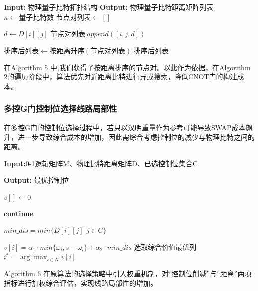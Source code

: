 \documentclass[10.5pt,compsoc,UTF8]{CjC}
\theoremstyle{mystyle}
\begin{document}
\begin{algorithm}[H]
\caption{按距离排序节点对}
\begin{algorithmic}[1]
\State \textbf{Input:} 物理量子比特拓扑结构
\State \textbf{Output:} 物理量子比特距离矩阵列表
\State $n \gets \text{量子比特数}$
\State $\text{节点对列表} \gets []$ 

        \State $d \gets D[i][j]$
        \State $\text{节点对列表}.append([i, j, d])$
    \EndFor
\EndFor

\State $\text{排序后列表} \gets \text{按距离升序}(\text{节点对列表})$
\State \Return 排序后列表

\end{algorithmic}
\end{algorithm}


在Algorithm 5 中,我们获得了按距离排序的节点对。以此作为依据，在Algorithm 2的遍历阶段中，算法优先对近距离比特进行异或搜索，降低CNOT门的构建成本。

\subsubsection{\textbf{多控G门控制位选择线路局部性}}
在多控G门的控制位选择过程中，若只以汉明重量作为参考可能导致SWAP成本飙升，进一步导致综合成本的增加，因此需综合考虑控制位的减少与物理比特之间的距离。
\begin{algorithm}[H]
\caption{多控G门控制位选择策略}
\label{alg:pick_column}
\begin{algorithmic}[1]
\State \textbf{Input:}0-1逻辑矩阵M、物理比特距离矩阵D、已选控制位集合C

\State \textbf{Output:} 最优控制位

\State $v[] \gets 0$                    

          
        \State \textbf{continue}
    \EndIf

    \State $min\_dis=min\{D[i][j]\ |j\in C\}$

    \State $v[i] =\alpha_1 \cdot min\{\omega_i,s-\omega_i\}+ \alpha_2\cdot min\_dis$  
    \EndFor
\State 选取综合价值最优列$i^* = \arg\max_{i \in N} v[i]$

\end{algorithmic}
\end{algorithm}
Algorithm 6 在原算法的选择策略中引入权重机制，对“控制位削减”与“距离”两项指标进行加权综合评估，实现线路局部性的增加。
\end{document}
